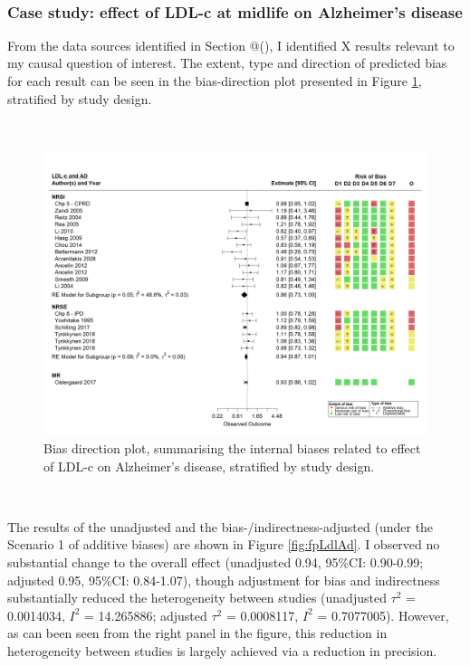 \documentclass[a4paper, twoside]{templates/ociamthesis}
\begin{document}
~

\hypertarget{case-study-effect-of-ldl-c-at-midlife-on-alzheimers-disease}{%
\subsubsection{Case study: effect of LDL-c at midlife on Alzheimer's disease}\label{case-study-effect-of-ldl-c-at-midlife-on-alzheimers-disease}}

From the data sources identified in Section @(), I identified X results relevant to my causal question of interest. The extent, type and direction of predicted bias for each result can be seen in the bias-direction plot presented in Figure \ref{fig:ldlAdBiasDirection}, stratified by study design.

~





\begin{figure}[H]
\includegraphics[width=1\linewidth]{figures/tri/midlife_AD} \caption[Bias direction plot, summarising internal biases related to the]{Bias direction plot, summarising the internal biases related to effect of LDL-c on Alzheimer's disease, stratified by study design.}\label{fig:ldlAdBiasDirection}
\end{figure}

~

The results of the unadjusted and the bias-/indirectness-adjusted (under the Scenario 1 of additive biases) are shown in Figure \ref{fig:fpLdlAd}. I observed no substantial change to the overall effect (unadjusted 0.94, 95\%CI: 0.90-0.99; adjusted 0.95, 95\%CI: 0.84-1.07), though adjustment for bias and indirectness substantially reduced the heterogeneity between studies (unadjusted \(\tau^2\) = 0.0014034, \(I^2\) = 14.265886; adjusted \(\tau^2\) = 0.0008117, \(I^2\) = 0.7077005). However, as can been seen from the right panel in the figure, this reduction in heterogeneity between studies is largely achieved via a reduction in precision.
\end{document}
